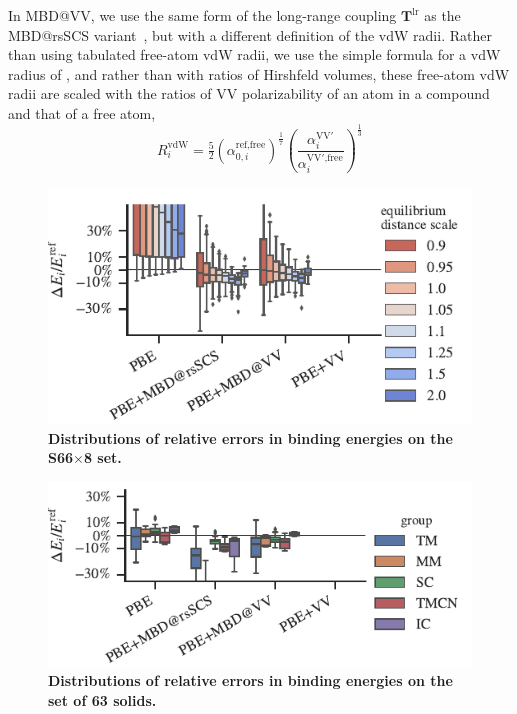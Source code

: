 In MBD@VV, we use the same form of the long-range coupling $\mathbf T^\text{lr}$ as the MBD@rsSCS variant~\citep{AmbrosettiJCP14}, but with a different definition of the vdW radii.
Rather than using tabulated free-atom vdW radii, we use the simple formula for a vdW radius of \citet{FedorovPRL18}, and rather than with ratios of Hirshfeld volumes, these free-atom vdW radii are scaled with the ratios of VV polarizability of an atom in a compound and that of a free atom,\begin{equation}
  R_i^\text{vdW}=\tfrac52{(\alpha_{0,i}^\text{ref,free})}^\frac17{\left(\frac{\alpha_i^\mathrm{VV'}}{\alpha_i^\text{VV$'$,free}}\right)}^\frac13
\end{equation}

\begin{figure}[t!]
\centering
\includegraphics{../media/s66-errors.pdf}
\caption{\textbf{Distributions of relative errors in binding energies on the S66$\times$8 set.}
}\label{fig:s66-errors}
\end{figure}

\begin{figure}[t!]
\centering
\includegraphics{../media/solids-errors.pdf}
\caption{\textbf{Distributions of relative errors in binding energies on the set of 63 solids.}
}\label{fig:solids-errors}
\end{figure}

